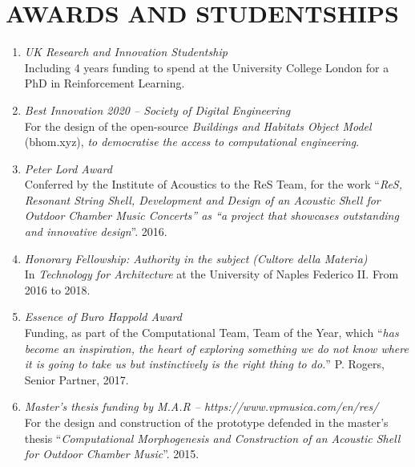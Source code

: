 \section*{AWARDS AND STUDENTSHIPS}
    \begin{enumerate}[leftmargin=0.45cm, itemsep=0em, topsep=0.5em, parsep=0.2em]
        \item
        \emph{UK Research and Innovation Studentship} \\
        Including 4 years funding to spend at the University College London for a PhD in Reinforcement Learning.
        \item
        \emph{Best Innovation 2020 – Society of Digital Engineering} \\
        For the design of the open-source \textit{Buildings and Habitats Object Model} (bhom.xyz), \textit{to democratise the access to computational engineering}.
        \item
        \emph{Peter Lord Award} \\
        Conferred by the Institute of Acoustics to the ReS Team, for the work “\textit{ReS, Resonant String Shell, Development and Design of an Acoustic Shell for Outdoor Chamber Music Concerts” as “a project that showcases outstanding and innovative design}”. 2016.
        \item
        \emph{Honorary Fellowship: Authority in the subject (Cultore della Materia)} \\
        In \textit{Technology for Architecture} at the University of Naples Federico II.
        From 2016 to 2018.
        \item
        \emph{Essence of Buro Happold Award} \\
        Funding, as part of the Computational Team, Team of the Year, which “\textit{has become an inspiration, the heart of exploring something we do not know where it is going to take us but instinctively is the right thing to do.}” P. Rogers, Senior Partner, 2017.
        \item
        \emph{Master’s thesis funding by M.A.R – https://www.vpmusica.com/en/res/}  \\
    For the design and construction of the prototype defended in the master’s thesis “\textit{Computational Morphogenesis and Construction of an Acoustic Shell for Outdoor Chamber Music}”. 2015.
    \end{enumerate}
